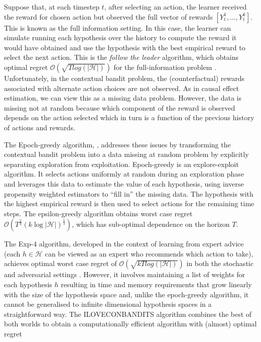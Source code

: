\documentclass[11pt,a4paper,oneside]{book}
\newcommand{\card}[1]{\left\vert{#1}\right\vert}
\newcommand{\bigo}[1]{\mathcal{O}\left( #1 \right)}
\newcommand{\cfb}[2]{{#1}_t^{#2}} %
\newcommand{\quotes}[1]{``#1''}
\theoremstyle{plain}
\theoremstyle{definition}
\begin{document}
Suppose that, at each timestep $t$, after selecting an action, the learner received the reward for chosen action but observed the full vector of rewards $[\cfb{Y}{1},...,\cfb{Y}{k}]$. This is known as the full information setting. In this case, the learner can simulate running each hypothesis over the history to compute the reward it would have obtained and use the hypothesis with the best empirical reward to select the next action. This is the \emph{follow the leader} algorithm, which obtains optimal regret $\bigo{\sqrt{T log(\card{\mathcal{H}})}}$ for the full-information problem \citep{cesa2006prediction}. Unfortunately, in the contextual bandit problem, the (counterfactual) rewards associated with alternate action choices are not observed. As in causal effect estimation, we can view this as a missing data problem. However, the data is missing not at random because which component of the reward is observed depends on the action selected which in turn is a function of the previous history of actions and rewards. 

The Epoch-greedy algorithm, \citep{Langford2008}, addresses these issues by transforming the contextual bandit problem into a data missing at random problem by explicitly separating exploration from exploitation. Epoch-greedy is an explore-exploit algorithm. It selects actions uniformly at random during an exploration phase and leverages this data to estimate the value of each hypothesis, using inverse propensity weighted estimators to \quotes{fill in} the missing data. The hypothesis with the highest empirical reward is then used to select actions for the remaining time steps. The epsilon-greedy algorithm obtains worst case regret $\bigo{T^{\frac{2}{3}}(k \log{\card{\mathcal{H}}})^{\frac{1}{3}}}$, which has sub-optimal dependence on the horizon $T$.

The Exp-4 algorithm, developed in the context of learning from expert advice (each $h \in \mathcal{H}$ can be viewed as an expert who recommends which action to take), achieves optimal worst case regret of $\bigo{\sqrt{kT log(\card{\mathcal{H}})}}$ in both the stochastic and adversarial settings \citep{Auer2002a}. However, it involves maintaining a list of weights for each hypothesis $h$ resulting in time and memory requirements that grow linearly with the size of the hypothesis space and, unlike the epoch-greedy algorithm, it cannot be generalised to infinite dimensional hypothesis spaces in a straightforward way. The ILOVECONBANDITS algorithm combines the best of both worlds to obtain a computationally efficient algorithm with (almost) optimal regret \citep{Agarwal2014}
\end{document}
